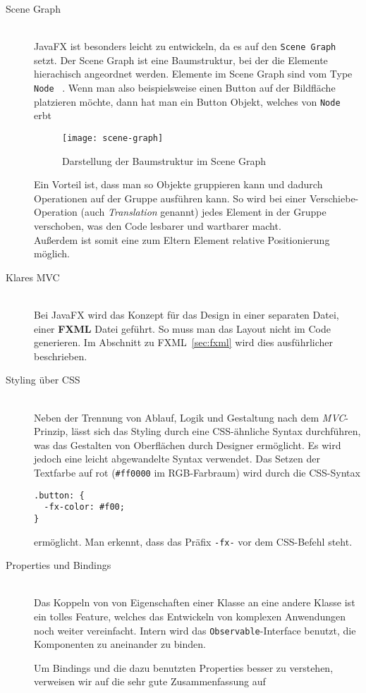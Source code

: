 \begin{description}
\item[Scene Graph]\hfill\\
JavaFX ist besonders leicht zu entwickeln, da es auf den \texttt{Scene Graph} setzt. Der Scene Graph ist eine Baumstruktur, bei der die Elemente hierachisch angeordnet werden. Elemente im Scene Graph sind vom Type \texttt{Node} ~\cite{ProJavaFX8}. Wenn man also beispielsweise einen Button auf der Bildfläche platzieren möchte, dann hat man ein Button Objekt, welches von \texttt{Node} erbt

\begin{figure}[!htb]
    \centering
      \texttt{[image: scene-graph]}
    \caption{Darstellung der Baumstruktur im Scene Graph}
    \label{fig:scene-graph}
\end{figure}

Ein Vorteil ist, dass man so Objekte gruppieren kann und dadurch Operationen auf der Gruppe ausführen kann. So wird bei einer Verschiebe-Operation (auch \textit{Translation} genannt) jedes Element in der Gruppe verschoben, was den Code lesbarer und wartbarer macht.\\
Außerdem ist somit eine zum Eltern Element relative Positionierung möglich.

\item[Klares MVC]\hfill\\
Bei JavaFX wird das Konzept für das Design in einer separaten Datei, einer \textbf{FXML} Datei geführt. So muss man das Layout nicht im Code generieren. Im Abschnitt zu FXML~\ref{sec:fxml} wird dies ausführlicher beschrieben.

\item[Styling über CSS]\hfill\\
Neben der Trennung von Ablauf, Logik und Gestaltung nach dem \textit{MVC}-Prinzip, lässt sich das Styling durch eine CSS-ähnliche Syntax durchführen, was das Gestalten von Oberflächen durch Designer ermöglicht. Es wird jedoch eine leicht abgewandelte Syntax verwendet. Das Setzen der Textfarbe auf rot (\texttt{\#ff0000} im RGB-Farbraum) wird durch die CSS-Syntax
\begin{verbatim}
.button: {
  -fx-color: #f00;
}
\end{verbatim}
ermöglicht. Man erkennt, dass das Präfix \texttt{-fx-} vor dem CSS-Befehl steht.

\item[Properties und Bindings]\hfill\\
Das Koppeln von von Eigenschaften einer Klasse an eine andere Klasse ist ein tolles Feature, welches das Entwickeln von komplexen Anwendungen noch weiter vereinfacht. Intern wird das \texttt{Observable}-Interface benutzt, die Komponenten zu aneinander zu binden.

Um Bindings und die dazu benutzten Properties besser zu verstehen, verweisen wir auf die sehr gute Zusammenfassung auf \cite{JavaBeginner-Binding}
\end{description}

